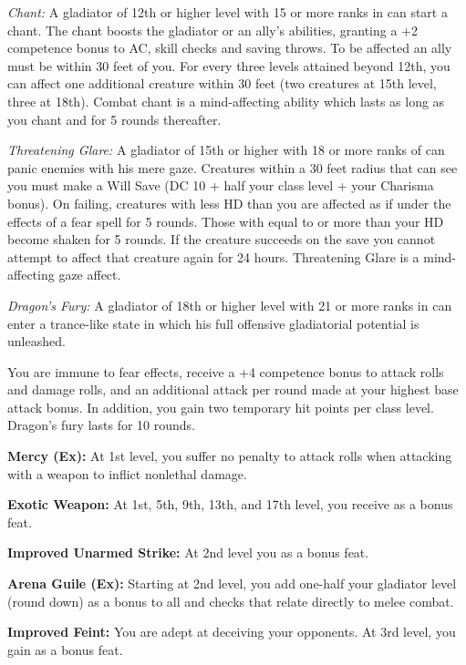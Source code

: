 \textit{Chant:} A gladiator of 12th or higher level with 15 or more ranks in  can start a chant. The chant boosts the gladiator or an ally's abilities, granting a +2 competence bonus to AC, skill checks and saving throws. To be affected an ally must be within 30 feet of you. For every three levels attained beyond 12th, you can affect one additional creature within 30 feet (two creatures at 15th level, three at 18th). Combat chant is a mind-affecting ability which lasts as long as you chant and for 5 rounds thereafter.

\textit{Threatening Glare:} A gladiator of 15th or higher with 18 or more ranks of  can panic enemies with his mere gaze. Creatures within a 30 feet radius that can see you must make a Will Save (DC 10 + half your class level + your Charisma bonus). On failing, creatures with less HD than you are affected as if under the effects of a fear spell for 5 rounds. Those with equal to or more than your HD become shaken for 5 rounds. If the creature succeeds on the save you cannot attempt to affect that creature again for 24 hours. Threatening Glare is a mind-affecting gaze affect.

\textit{Dragon's Fury:} A gladiator of 18th or higher level with 21 or more ranks in  can enter a trance-like state in which his full offensive gladiatorial potential is unleashed.

You are immune to fear effects, receive a +4 competence bonus to attack rolls and damage rolls, and an additional attack per round made at your highest base attack bonus. In addition, you gain two temporary hit points per class level. Dragon's fury lasts for 10 rounds.

\textbf{Mercy (Ex):} At 1st level, you suffer no penalty to attack rolls when attacking with a weapon to inflict nonlethal damage.

\textbf{Exotic Weapon:} At 1st, 5th, 9th, 13th, and 17th level, you receive  as a bonus feat.

\textbf{Improved Unarmed Strike:} At 2nd level you  as a bonus feat.

\textbf{Arena Guile (Ex):} Starting at 2nd level, you add one-half your gladiator level (round down) as a bonus to all  and  checks that relate directly to melee combat.

\textbf{Improved Feint:} You are adept at deceiving your opponents. At 3rd level, you gain  as a bonus feat.

